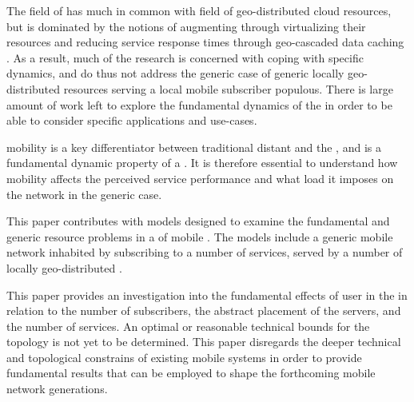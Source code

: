 The field of \xcloud{} has much in common with field of geo-distributed cloud resources, but is dominated by the notions of augmenting \ues{} through virtualizing their resources \cite{6563280} and reducing service response times through geo-cascaded data caching \cite{1437087,ericsson_akami}. As a result, much of the research is concerned with coping with specific dynamics, and do thus not address the generic case of generic locally geo-distributed resources serving a local mobile subscriber populous. There is large amount of work left to explore the fundamental dynamics of the \xcloud{} in order to be able to consider specific applications and use-cases.

\Ue{} mobility is a key differentiator between traditional distant \dcs{} and the \xcloud{}, and is a fundamental dynamic property of a \xcloud{}. It is therefore essential to understand how \ue{} mobility affects the perceived service performance and what load it imposes on the network in the generic case.

This paper contributes with models designed to examine the fundamental and generic resource problems in a \xcloud{} of mobile \ues{}. The models include a generic mobile network inhabited by \ues{} subscribing to a number of services, served by a number of locally geo-distributed \dcs{}.

This paper provides an investigation into the fundamental effects of user \ue{} in the \xcloud{} in relation to the number of subscribers, the abstract placement of the servers, and the number of services. An optimal or reasonable technical bounds for the \xcloud{} topology is not yet to be determined. This paper disregards the deeper technical and topological constrains of existing mobile systems in order to provide fundamental results that can be employed to shape the forthcoming mobile network generations.